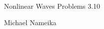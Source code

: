 \documentclass{article}
\begin{document}
\begin{center}
    {\huge Nonlinear Waves Problems 3.10}
    \vspace{0.5cm}

    {\large Michael Nameika}
\end{center}

\begin{itemize}



\end{itemize}
\end{document}
